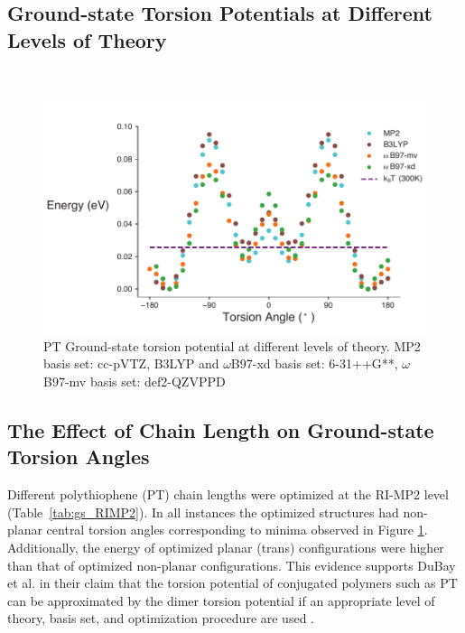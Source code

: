 \subsection{Ground-state Torsion Potentials at Different Levels of Theory}
\
\begin{figure}[hbt!]
    \centering
    \includegraphics{figures/append_tor_model/SI_compare_theory_torsion.pdf}
    \caption[Ground-state PT Torsion Potential at Different Levels of Theory]{PT Ground-state torsion potential at different levels of theory. MP2 basis set: cc-pVTZ, B3LYP and $\omega$B97-xd basis set: 6-31++G**, $\omega$B97-mv basis set: def2-QZVPPD}
    \label{fig:gs_theory}
\end{figure}

\subsection{The Effect of Chain Length on Ground-state Torsion Angles}
\label{subsec:chain_length_gs}

Different polythiophene (PT) chain lengths were optimized at the RI-MP2 level (Table~\ref{tab:gs_RIMP2}). In all instances the optimized structures had non-planar central torsion angles corresponding to minima observed in Figure \ref{fig:gs_theory}. Additionally, the energy of optimized planar (trans) configurations were higher than that of optimized non-planar configurations. This evidence supports DuBay et al. in their claim that the torsion potential of conjugated polymers such as PT can be approximated by the dimer torsion potential if an appropriate level of theory, basis set, and optimization procedure are used \cite{Dubay2012}.

